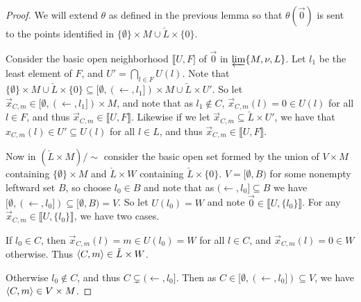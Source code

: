 \documentclass[11pt]{article}
\newcommand{\vect}{\vec}
\newcommand{\lb}{\llbracket}
\newcommand{\rb}{\rrbracket}
\begin{document}
  \begin{proof}
    We will extend \(\theta\) as defined in the previous lemma so that
    \(\theta(\vect 0)\) is sent to the points identified in
    \(\{\emptyset\}\times M\cup\check L\times \{0\}\).

    Consider the basic open neighborhood \(\lb U,F]\) of \(\vect 0\) in
    \(\varprojlim\{M,\nu,L\}\). Let \(l_1\) be the least element of \(F\),
    and \(U'=\bigcap_{l\in F}U(l)\). Note that
    \(
      \{\emptyset\}\times M\cup\check L\times \{0\}
        \subseteq
      [\emptyset,(\leftarrow,l_1])\times M
      \cup
      \check L\times U'
    \). So let
    \(
      \vect x_{C,m}
        \in
      [\emptyset,(\leftarrow,l_1])\times M
    \),
    and note that as \(l_1\not\in C\), \(\vect x_{C,m}(l)=0\in U(l)\) for all
    \(l\in F\), and thus \(\vect x_{C,m}\in\lb U,F\rb\).
    Likewise if we let
    \(
      \vect x_{C,m}
        \subseteq
      \check L\times U'
    \),
    we have that \(x_{C,m}(l)\in U'\subseteq U(l)\) for all \(l\in L\), and
    thus \(\vect x_{C,m}\in\lb U,F\rb\).

    Now in \((\check L\times M)/\sim\)
    consider the basic open set formed by the union of
    \(V\times M\) containing \(\{\emptyset\}\times M\) and
    \(\check L\times W\) containing \(\check L\times \{0\}\).
    \(V=[\emptyset,B)\) for some nonempty leftward set \(B\),
    so choose \(l_0\in B\) and note that as
    \((\leftarrow,l_0]\subseteq B\) we have
    \([\emptyset,(\leftarrow,l_0])\subseteq[\emptyset,B)=V\).
    So let \(U(l_0)=W\) and note \(\vect 0\in\lb U,\{l_0\}\rb \). For any
    \(\vect x_{C,m}\in\lb U,\{l_0\}\rb \), we have two cases.

    If \(l_0\in C\), then \(\vect x_{C,m}(l)=m\in U(l_0)=W\) for all \(l\in C\),
    and \(\vect x_{C,m}(l)=0\in W\) otherwise. Thus
    \(\langle C,m\rangle\in\check L\times W\).

    Otherwise \(l_0\not\in C\), and thus \(C\subsetneq(\leftarrow,l_0]\).
    Then as \(C\in [\emptyset,(\leftarrow,l_0])\subseteq V\),
    we have \(\langle C,m\rangle\in V\times M\).
    \end{proof}




















  \newpage
\end{document}
